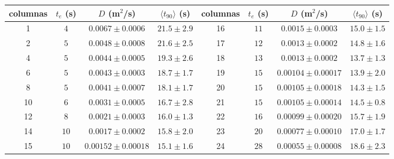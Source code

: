\begin{tabular}{cccc|cccc}
  \hline
  columnas & $t_e$ (s) & $D$ (m$^{2}$/s) & $\langle t_{90}\rangle$ (s) & columnas & $t_e$ (s) & $D$ (m$^{2}$/s) & $\langle t_{90}\rangle$ (s) \\
  \hline
  1 & $4$ & $0.0067 \pm 0.0006$ & $21.5 \pm 2.9$ & 16 & $11$ & $0.0015 \pm 0.0003$ & $15.0 \pm 1.5$ \\
  2 & $5$ & $0.0048 \pm 0.0008$ & $21.6 \pm 2.5$ & 17 & $12$ & $0.0013 \pm 0.0002$ & $14.8 \pm 1.6$ \\
  4 & $5$ & $0.0044 \pm 0.0005$ & $19.3 \pm 2.6$ & 18 & $13$ & $0.0013 \pm 0.0002$ & $13.7 \pm 1.3$ \\
  6 & $5$ & $0.0043 \pm 0.0003$ & $18.7 \pm 1.7$ & 19 & $15$ & $0.00104 \pm 0.00017$ & $13.9 \pm 2.0$ \\
  8 & $5$ & $0.0041 \pm 0.0007$ & $18.1 \pm 1.7$ & 20 & $15$ & $0.00105 \pm 0.00018$ & $14.3 \pm 1.5$ \\
  10 & $6$ & $0.0031 \pm 0.0005$ & $16.7 \pm 2.8$ & 21 & $15$ & $0.00105 \pm 0.00014$ & $14.5 \pm 0.8$ \\
  12 & $8$ & $0.0021 \pm 0.0003$ & $16.0 \pm 1.3$ & 22 & $16$ & $0.00099 \pm 0.00020$ & $15.7 \pm 1.9$ \\
  14 & $10$ & $0.0017 \pm 0.0002$ & $15.8 \pm 2.0$ & 23 & $20$ & $0.00077 \pm 0.00010$ & $17.0 \pm 1.7$ \\
  15 & $10$ & $0.00152 \pm 0.00018$ & $15.1 \pm 1.6$ & 24 & $28$ & $0.00055 \pm 0.00008$ & $18.6 \pm 2.3$ \\
  \hline
\end{tabular}

